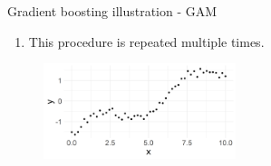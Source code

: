 \begin{vbframe}{Gradient boosting illustration - GAM}
\begin{enumerate}
  \item
    This procedure is repeated multiple times.

\end{enumerate}

\vfill

\begin{figure}
  \includegraphics[width=0.5\textwidth]{figure/illustration_data_normal_scaled.png}
\end{figure}

\end{vbframe}


